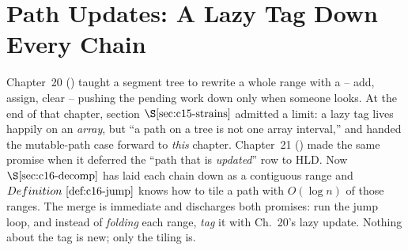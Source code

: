\section{Path Updates: A Lazy Tag Down Every Chain}\label{sec:c16-pathupd}

\begin{previouslybox}
Chapter~20 () taught a segment tree to rewrite a whole range with a  -- add, assign, clear -- pushing the pending work down only when someone looks.  At the end of that chapter, section \(\secref{c15-strains}\) admitted a limit: a lazy tag lives happily on an \emph{array}, but ``a path on a tree is not one array interval,'' and handed the mutable-path case forward to \emph{this} chapter.  Chapter~21 () made the same promise when it deferred the ``path that is \emph{updated}'' row to HLD.  Now \(\secref{c16-decomp}\) has laid each chain down as a contiguous range and \(\defref{c16-jump}\) knows how to tile a path with \(O(\log n)\) of those ranges.  The merge is immediate and discharges both promises: run the jump loop, and instead of \emph{folding} each range, \emph{tag} it with Ch.~20's lazy update.  Nothing about the tag is new; only the tiling is.
\end{previouslybox}

